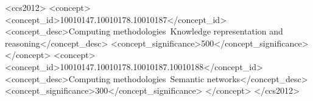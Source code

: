 \documentclass[sigconf, anonymous, review]{acmart}
\begin{document}

\author{Yunjun Gao$^{*\dagger}$, Xiaoze Liu$^{*\dagger}$, Junyang Wu$^{\dagger}$, Tianyi Li$^{\S}$, Pengfei Wang$^{\dagger}$,  Lu Chen$^{\dagger}$}

\renewcommand{\shortauthors}{Gao et al.}




\begin{CCSXML}
<ccs2012>
<concept>
<concept_id>10010147.10010178.10010187</concept_id>
<concept_desc>Computing methodologies~Knowledge representation and reasoning</concept_desc>
<concept_significance>500</concept_significance>
</concept>
<concept>
<concept_id>10010147.10010178.10010187.10010188</concept_id>
<concept_desc>Computing methodologies~Semantic networks</concept_desc>
<concept_significance>300</concept_significance>
</concept>
</ccs2012>
\end{CCSXML}




\maketitle 








\pagebreak
\begin{appendices}

\end{appendices}

\balance
\end{document}
